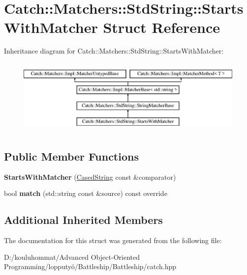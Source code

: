 \hypertarget{struct_catch_1_1_matchers_1_1_std_string_1_1_starts_with_matcher}{}\section{Catch\+:\+:Matchers\+:\+:Std\+String\+:\+:Starts\+With\+Matcher Struct Reference}
\label{struct_catch_1_1_matchers_1_1_std_string_1_1_starts_with_matcher}
Inheritance diagram for Catch\+:\+:Matchers\+:\+:Std\+String\+:\+:Starts\+With\+Matcher\+:\begin{figure}[H]
\begin{center}
\leavevmode
\includegraphics[height=3.758389cm]{struct_catch_1_1_matchers_1_1_std_string_1_1_starts_with_matcher}
\end{center}
\end{figure}
\subsection*{Public Member Functions}
\begin{DoxyCompactItemize}
\item 
\mbox{\label{struct_catch_1_1_matchers_1_1_std_string_1_1_starts_with_matcher_a7b86f258bdbd131a6e7bcd94a8977325}} 
{\bfseries Starts\+With\+Matcher} (\mbox{\hyperlink{struct_catch_1_1_matchers_1_1_std_string_1_1_cased_string}{Cased\+String}} const \&comparator)
\item 
\mbox{\label{struct_catch_1_1_matchers_1_1_std_string_1_1_starts_with_matcher_a7da4747aed0c48989d8be59a89e2b7fb}} 
bool {\bfseries match} (std\+::string const \&source) const override
\end{DoxyCompactItemize}
\subsection*{Additional Inherited Members}


The documentation for this struct was generated from the following file\+:\begin{DoxyCompactItemize}
\item 
D\+:/kouluhommat/\+Advanced Object-\/\+Oriented Programming/lopputyö/\+Battleship/\+Battleship/catch.\+hpp\end{DoxyCompactItemize}
